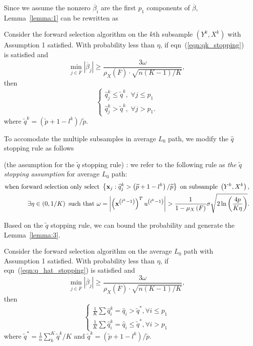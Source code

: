 \documentclass[11pt,review,authoryear]{elsarticle}
\begin{document}
\begin{appendices}
Since we assume the nonzero $\overline{\beta}_i$ are the first $p_1$ components of $\overline{\beta}$, Lemma~\ref{lemma:1} can be rewritten as 
%
\begin{lemma}
  Consider the forward selection algorithm on the $k$th subsample $\left(Y^{k},X^{k}\right)$ with Assumption 1 satisfied. With probability less than $\eta$, if eqn~(\ref{eqn:qk_stopping}) is satisfied and
  \[
      \min_{j\in\overline{F}}\left|\overline{\beta}_{j}\right|\geqslant\frac{3\omega}{\rho_{X}\left(\overline{F}\right)\cdot\sqrt{n\left(K-1\right)/K}},
  \]
  then 
  \[
  \begin{cases}
      \widehat{q}_j^k \leqslant \widetilde{q}^k, \; \forall j\leqslant p_1\\
      \widehat{q}_j^k > \widetilde{q}^k, \; \forall j>p_1.
  \end{cases}
  \]
  where $\widetilde{q}^k = \left(\widetilde{p} + 1 - l^k\right) / \widetilde{p}$.
  \label{lemma:2}
\end{lemma}
To accomodate the multiple subsamples in average $L_0$ path, we modify the $\widehat{q}$ stopping rule as follows
%
\begin{definition}
  (the assumption for the $\widetilde{q}$ stopping rule) : we refer to the following rule as \emph{the $\widetilde{q}$ stopping assumption} for average $L_0$ path:
  \begin{eqnarray}
    \mbox{when forward selection only select } \left\{ \mathbf{x}_j:\widehat{q}_j^k > \left( \widetilde{p} + 1 - l^k \right) / \widetilde{p} \right\} \mbox{ on subsample } \left(Y^k, X^k \right), \notag \\ 
    \exists \eta \in \left( 0, 1/K\right) \mbox{ such that } \omega = \left\vert \left( \mathbf{x}^{\left( l^k -1 \right)}\right) ^T u^{\left(l^{k}-1\right)} \right\vert >\frac{1}{1-\mu_{X}\left(F\right)}\sigma\sqrt{2\ln\left( \frac{4p}{K\eta}\right)}.
    \label{eqn:q_hat_stopping}
  \end{eqnarray}
\end{definition}
\medskip

Based on the $\widetilde{q}$ stopping rule, we can bound the probability and generate the Lemma~\ref{lemma:3}.

\begin{lemma}
  Consider the forward selection algorithm on the average $L_{0}$ path with Assumption 1 satisfied. With probability less than $\eta$, if eqn~(\ref{eqn:q_hat_stopping}) is satisfied and 
  \[
      \min_{j\in\overline{F}}\left|\overline{\beta}_{j}\right|\geqslant\frac{3\omega}{\rho_{X}\left(\overline{F}\right)\cdot\sqrt{n\left(K-1\right)/K}},
  \]
  then 
  \[
  \begin{cases}
      \frac{1}{K}\sum\widehat{q}_{i}^{k}=\widehat{q}_{i}>\widetilde{q}^{*},\forall i\leqslant p_{1}\\
      \frac{1}{K}\sum\widehat{q}_{i}^{k}=\widehat{q}_{i}\leqslant\widetilde{q}^{*},\forall i>p_{1}
  \end{cases}
  \]
  where $\widetilde{q}^* = \frac{1}{n} \sum_k^K \widetilde{q}^k / K$ and $\widetilde{q}^k = \left(\widetilde{p} + 1 - l^k\right) / \widetilde{p}$.
  \label{lemma:3}
\end{lemma}


\end{appendices}
\end{document}
